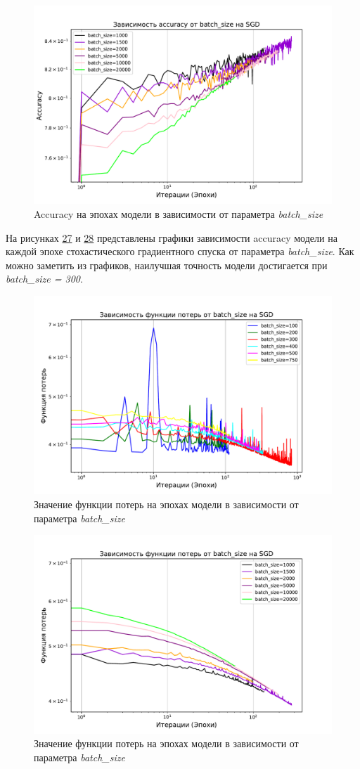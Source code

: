\documentclass[14pt]{extarticle}
\begin{document}
\begin{figure}[H]
    \centering
    \includegraphics[width=0.7\linewidth]
    {exp_5_acc_batches_2.pdf}
    \caption{Accuracy на эпохах модели в зависимости от параметра \textit{batch\_size}}
    \label{fig:exp_5_acc_batches_2}
\end{figure}

На рисунках \hyperref[fig:exp_5_acc_batches_1]{27} и \hyperref[fig:exp_5_acc_batches_2]{28} представлены графики зависимости accuracy модели на каждой эпохе стохастического градиентного спуска от параметра \textit{batch\_size}. Как можно заметить из графиков, наилучшая точность модели достигается при \textit{batch\_size = 300}.

\begin{figure}[H]
    \centering
    \includegraphics[width=0.7\linewidth]
    {exp_5_loss_batches_1.pdf}
    \caption{Значение функции потерь на эпохах модели в зависимости от параметра \textit{batch\_size}}
    \label{fig:exp_5_loss_batches_1}
\end{figure}

\begin{figure}[H]
    \centering
    \includegraphics[width=0.7\linewidth]
    {exp_5_loss_batches_2.pdf}
    \caption{Значение функции потерь на эпохах модели в зависимости от параметра \textit{batch\_size}}
    \label{fig:exp_5_loss_batches_2}
\end{figure}
\end{document}
